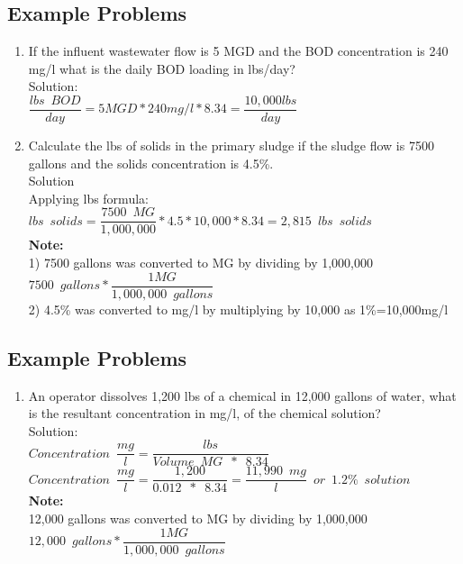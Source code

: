 \documentclass{article}
\begin{document}
\subsection{Example Problems} 
\begin{enumerate}
\item If the influent wastewater flow is 5 MGD and the BOD concentration is 240 mg/l what is the daily BOD loading in lbs/day?\\
Solution:\\
$\dfrac{lbs \enspace BOD}{day}=5MGD*240mg/l*8.34=\boxed{\dfrac{10,000lbs}{day}}$\\

\item Calculate the lbs of solids in the primary sludge if the sludge flow is 7500 gallons and the solids concentration is 4.5\%.\\
Solution\\
Applying lbs formula:\\
$lbs \enspace solids = \dfrac{7500 \enspace MG}{1,000,000} * 4.5*10,000 *8.34 = \boxed{2,815 \enspace lbs \enspace solids}$\\
\textbf{Note:}\\  
1) 7500 gallons was converted to MG by dividing by 1,000,000\\
$7500 \enspace gallons * \dfrac{1 MG}{1,000,000 \enspace gallons}$\\
2) 4.5\% was converted to mg/l by multiplying by 10,000 as 1\%=10,000mg/l

\end{enumerate}

\subsection{Example Problems} 

\begin{enumerate}
\item An operator dissolves 1,200 lbs of a chemical in 12,000 gallons of water, what is the resultant concentration in mg/l, of the chemical solution?\\
Solution:\\
$Concentration \enspace \dfrac{mg}{l}=\dfrac{lbs}{Volume \enspace MG \enspace * \enspace 8.34}$\\
$Concentration \enspace \dfrac{mg}{l}=\dfrac{1,200}{0.012 \enspace * \enspace 8.34}=\boxed{\dfrac{11,990 \enspace mg}{l} \enspace or \enspace 1.2\% \enspace solution}$\\
\textbf{Note:}\\  
12,000 gallons was converted to MG by dividing by 1,000,000\\
$12,000 \enspace gallons * \dfrac{1 MG}{1,000,000 \enspace gallons}$\\


\end{enumerate}
\newpage
\end{document}
